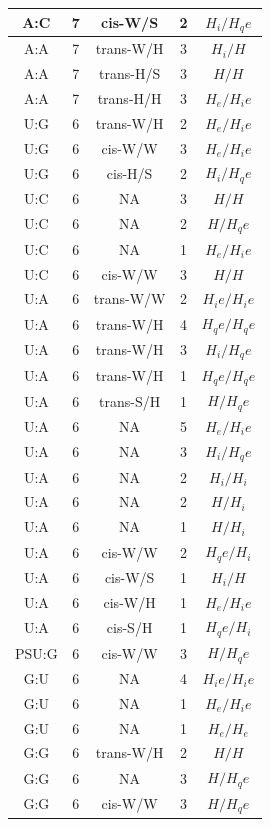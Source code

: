 \begin{center}
\begin{longtable}{c|c|c|c|c}
A:C & 7 & cis-W/S & 2 & $H_i/H_qe$ \\  \hline
A:A & 7 & trans-W/H & 3 & $H_i/H$ \\  \hline
A:A & 7 & trans-H/S & 3 & $H/H$ \\  \hline
A:A & 7 & trans-H/H & 3 & $H_e/H_ie$ \\  \hline
U:G & 6 & trans-W/H & 2 & $H_e/H_ie$ \\  \hline
U:G & 6 & cis-W/W & 3 & $H_e/H_ie$ \\  \hline
U:G & 6 & cis-H/S & 2 & $H_i/H_qe$ \\  \hline
U:C & 6 & NA & 3 & $H/H$ \\  \hline
U:C & 6 & NA & 2 & $H/H_qe$ \\  \hline
U:C & 6 & NA & 1 & $H_e/H_ie$ \\  \hline
U:C & 6 & cis-W/W & 3 & $H/H$ \\  \hline
U:A & 6 & trans-W/W & 2 & $H_ie/H_ie$ \\  \hline
U:A & 6 & trans-W/H & 4 & $H_qe/H_qe$ \\  \hline
U:A & 6 & trans-W/H & 3 & $H_i/H_qe$ \\  \hline
U:A & 6 & trans-W/H & 1 & $H_qe/H_qe$ \\  \hline
U:A & 6 & trans-S/H & 1 & $H/H_qe$ \\  \hline
U:A & 6 & NA & 5 & $H_e/H_ie$ \\  \hline
U:A & 6 & NA & 3 & $H_i/H_qe$ \\  \hline
U:A & 6 & NA & 2 & $H_i/H_i$ \\  \hline
U:A & 6 & NA & 2 & $H/H_i$ \\  \hline
U:A & 6 & NA & 1 & $H/H_i$ \\  \hline
U:A & 6 & cis-W/W & 2 & $H_qe/H_i$ \\  \hline
U:A & 6 & cis-W/S & 1 & $H_i/H$ \\  \hline
U:A & 6 & cis-W/H & 1 & $H_e/H_ie$ \\  \hline
U:A & 6 & cis-S/H & 1 & $H_qe/H_i$ \\  \hline
PSU:G & 6 & cis-W/W & 3 & $H/H_qe$ \\  \hline
G:U & 6 & NA & 4 & $H_ie/H_ie$ \\  \hline
G:U & 6 & NA & 1 & $H_e/H_ie$ \\  \hline
G:U & 6 & NA & 1 & $H_e/H_e$ \\  \hline
G:G & 6 & trans-W/H & 2 & $H/H$ \\  \hline
G:G & 6 & NA & 3 & $H/H_qe$ \\  \hline
G:G & 6 & cis-W/W & 3 & $H/H_qe$ \\  \hline

\end{longtable}
\end{center}
